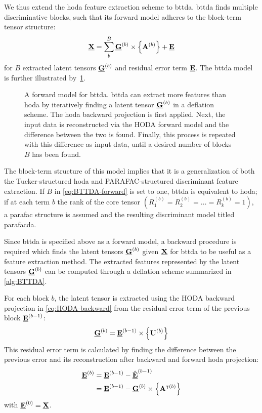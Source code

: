 \documentclass[twocolumn]{article}
\begin{document}
We thus extend the \ac{hoda} feature extraction scheme to \acf{bttda}.
\Ac{bttda} finds multiple discriminative blocks, such that its forward
model adheres to the block-term tensor structure:
\begin{equation}
	\underline{\mathbf{X}} = \sum_b^B\underline{\mathbf{G}}^{(b)}\times\left\{\mathbf{A}^{(b)}\right\} + \underline{\mathbf{E}}
	\label{eq:BTTDA-forward}
\end{equation}
for $B$ extracted latent tensors $\underline{\mathbf{G}}^{(b)}$ and residual error term
$\underline{\mathbf{E}}$.
The \ac{bttda} model is further illustrated by~\cref{fig:BTTDA}.
\begin{figure*}[t]
	\centering
	
	\caption[A forward model for \acs{bttda}.]{A forward model for \acf{bttda}.
		\Ac{bttda} can extract more features
		than \ac{hoda} by iteratively finding a latent tensor $\underline{\mathbf{G}}^{(b)}$ in a
		deflation scheme.
		The \ac{hoda} backward projection is first applied. Next, the
		input data is reconstructed via the HODA forward model and the
		difference between the two is found.
		Finally, this process is repeated with this difference as input data, until a
		desired number of blocks $B$ has been found.}
	\label{fig:BTTDA}
\end{figure*}
The block-term structure of this model implies that it is a generalization of both
the Tucker-structured \ac{hoda} and PARAFAC-structured discriminant feature
extraction.
If $B$ in \cref{eq:BTTDA-forward} is set to one, \ac{bttda} is equivalent to
\ac{hoda}; if at each term $b$ the rank of the core tensor
$(R_1^{(b)}=R_2^{(b)}=\ldots=R_k^{(b)}=1)$, a \ac{parafac} structure is assumed and
the resulting discriminant model titled \ac{parafacda}.

Since \ac{bttda} is specified above as a forward model, a backward procedure
is required which finds the latent tensors $\underline{\mathbf{G}}^{(b)}$ given $\underline{\mathbf{X}}$ for
\ac{bttda} to be useful as a feature extraction method.
The extracted features represented by the latent tensors $\underline{\mathbf{G}}^{(b)}$ can be
computed through a deflation scheme summarized in \cref{alg:BTTDA}.
\begin{algorithm}
	\caption{\Ac{bttda} feature extraction.}
	\label{alg:BTTDA}
	
\end{algorithm}
For each block $b$, the latent tensor is extracted using the HODA backward
projection in \cref{eq:HODA-backward} from the residual error term of the previous
block $\underline{\mathbf{E}}^{(b-1)}$:
\begin{equation}
	\underline{\mathbf{G}}^{(b)} = \underline{\mathbf{E}}^{(b-1)}\times\left\{\mathbf{U}^{(b)}\right\}
\end{equation}
This residual error term is calculated by finding the difference between the
previous error and its reconstruction after backward and forward \ac{hoda}
projection:
\begin{align}
	\underline{\mathbf{E}}^{(b)}
	 & = \underline{\mathbf{E}}^{(b-1)} - \hat{\underline{\mathbf{E}}}^{(b-1)}                      \\
	 & = \underline{\mathbf{E}}^{(b-1)} - \underline{\mathbf{G}}^{(b)}\times\left\{\mathbf{A}^{\intercal(b)}\right\}
\end{align}
with $\underline{\mathbf{E}}^{(0)}=\underline{\mathbf{X}}$.
\end{document}
